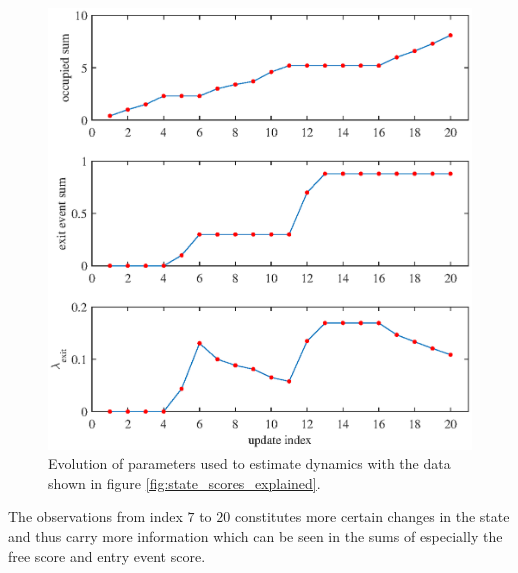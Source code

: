 \begin{figure}[htbp]
\centering
\includegraphics[scale=1]{chapters/mapping_of_dynamic_areas/figures/pmac_exit_explained}
\caption{Evolution of parameters used to estimate dynamics with the data shown in figure \ref{fig:state_scores_explained}.}
\label{fig:pmac_exit_explained}
\end{figure}

The observations from index $7$ to $20$ constitutes more certain changes in the state and thus carry more information which can be seen in the sums of especially the free score and entry event score. 

